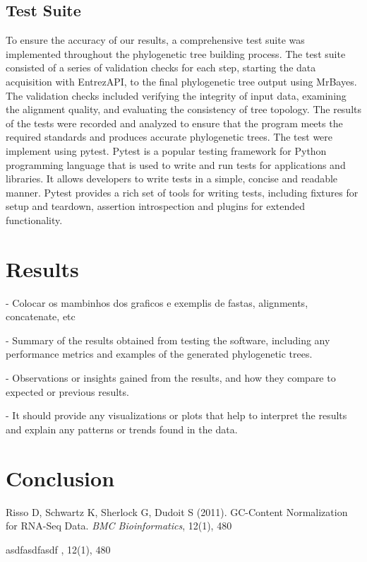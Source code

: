 \documentclass[12pt]{article}
\begin{document}
\subsection{Test Suite}
To ensure the accuracy of our results, a comprehensive test suite was implemented throughout the phylogenetic tree building process. The test suite consisted of a series of validation checks for each step, starting the data acquisition with EntrezAPI, to the final phylogenetic tree output using MrBayes. The validation checks included verifying the integrity of input data, examining the alignment quality, and evaluating the consistency of tree topology. The results of the tests were recorded and analyzed to ensure that the program meets the required standards and produces accurate phylogenetic trees. The test were implement using pytest. Pytest is a popular testing framework for Python programming language that is used to write and run tests for applications and libraries. It allows developers to write tests in a simple, concise and readable manner. Pytest provides a rich set of tools for writing tests, including fixtures for setup and teardown, assertion introspection and plugins for extended functionality.

\section{Results}\label{sec:desenvolvimentos}



- Colocar os mambinhos dos graficos e exemplis de fastas, alignments, concatenate, etc

- Summary of the results obtained from testing the software, including any performance metrics and examples of the generated phylogenetic trees. 

- Observations or insights gained from the results, and how they compare to expected or previous results. 

- It should provide any visualizations or plots that help to interpret the results and explain any patterns or trends found in the data.





\section{Conclusion}\label{sec:conclusoes}



\begin{thebibliography}{}

Risso D, Schwartz K, Sherlock G, Dudoit S (2011). GC-Content Normalization for RNA-Seq Data. \textit{BMC Bioinformatics}, 12(1), 480

asdfasdfasdf \textit{}, 12(1), 480

\end{thebibliography}

\appendixpage
\end{document}
